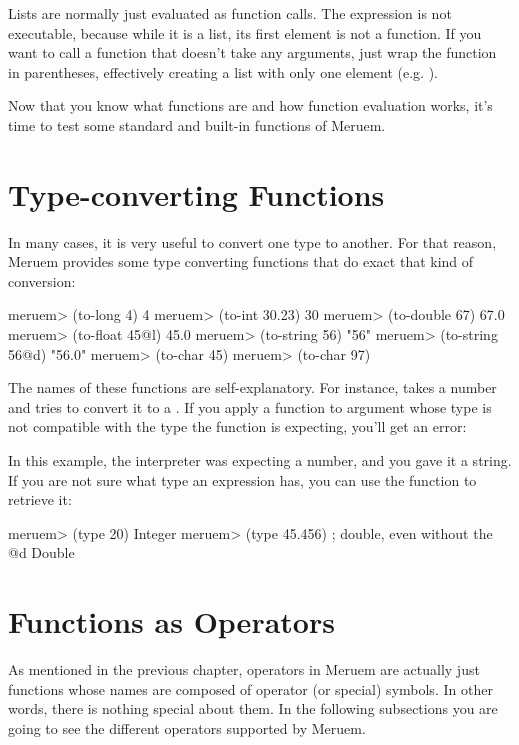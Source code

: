 Lists are normally just evaluated as function calls. The expression  is not executable, because while it is a list, its first element is not a function. If you want to call a function that doesn't take any arguments, just wrap the function in parentheses, effectively creating a list with only one element (e.g. ).

Now that you know what functions are and how function evaluation works, it's time to test some standard and built-in functions of Meruem.

\section{Type-converting Functions}
In many cases, it is very useful to convert one type to another. For that reason, Meruem provides some type converting functions that do exact that kind of conversion:

\begin{REPL}
meruem> (to-long 4)
4
meruem> (to-int 30.23)  
30
meruem> (to-double 67)
67.0
meruem> (to-float 45@l)
45.0
meruem> (to-string 56)
"56"
meruem> (to-string 56@d)
"56.0"
meruem> (to-char 45)
\-
meruem> (to-char 97)
\a
\end{REPL}

The names of these functions are self-explanatory. For instance,  takes a number and tries to convert it to a . If you apply a function to argument whose type is not compatible with the type the function is expecting, you'll get an error:

\begin{REPL}
meruem> (to-char "the")
An error has occurred. Invalid Type. Not a Number: the
Source: .home.melvic.meruem.meruem.prelude [1:10}]
(to-char "the")
         ^
\end{REPL}

In this example, the interpreter was expecting a number, and you gave it a string. If you are not sure what type an expression has, you can use the  function to retrieve it:

\begin{REPL}
meruem> (type 20)
Integer
meruem> (type 45.456)  ; double, even without the @d
Double
\end{REPL}

\section{Functions as Operators}
As mentioned in the previous chapter, operators in Meruem are actually just functions whose names are composed of operator (or special) symbols. In other words, there is nothing special about them. In the following subsections you are going to see the different operators supported by Meruem.

